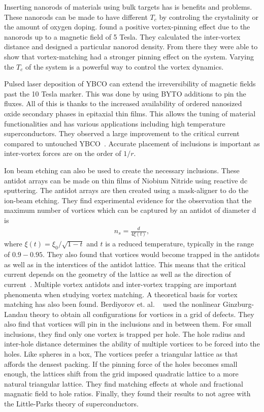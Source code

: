 Inserting nanorods of materials using bulk targets has is benefits and problems. These nanorods can be made to have different $T_c$ by controling the crystalinity or the amount of oxygen doping. \cite{Horii15} found a positive vortex-pinning effect due to the nanorods up to a magnetic field of 5 Tesla. They calculated the inter-vortex distance and designed a particular nanorod density. From there they were able to show that vortex-matching had a stronger pinning effect on the system. Varying the $T_c$ of the system is a powerful way to control the vortex dynamics.

Pulsed laser deposition of YBCO can extend the irreversibility of magnetic fields past the 10 Tesla marker. This was done by using BYTO additions to pin the fluxes. All of this is thanks to the increased availability of ordered nanosized oxide secondary phases in epitaxial thin films. This allows the tuning of material functionalities and has various applications including high temperature superconductors. They observed a large improvement to the critical current compared to untouched YBCO~\cite{Rizzo16}. Accurate placement of inclusions is important as inter-vortex forces are on the order of $1/r$.      

Ion beam etching can also be used to create the necessary inclusions. These antidot arrays can be made on thin films of Niobium Nitride using reactive dc sputtering. The antidot arrays are then created using a mask-aligner to do the ion-beam etching. They find experimental evidence for the observation that the maximum number of vortices which can be captured by an antidot of diameter d is
\begin{eqnarray}
n_s = \frac {d} {4 \xi(t)}, 
\label{}
\end{eqnarray}
where $\xi(t) = \xi_0 / \sqrt{1-t}$ and $t$ is a reduced temperature, typically in the range of $0.9 - 0.95$. They also found that vortices would become trapped in the antidots as well as in the interstices of the antidot lattice. This means that the critical current depends on the geometry of the lattice as well as the direction of current~\cite{Thakur09}. Multiple vortex antidots and inter-vortex trapping are important phenomenta when studying vortex matching. A theoretical basis for vortex matching has also been found. Berdiyorov et. al. ~\cite{Berdiyorov06} used the nonlinear Ginzburg-Landau theory to obtain all configurations for vortices in a grid of defects. They also find that vortices will pin in the inclusions and in between them. For small inclusions, they find only one vortex is trapped per hole. The hole radius and inter-hole distance determines the ability of multiple vortices to be forced into the holes. Like spheres in a box, The vortices prefer a triangular lattice as that affords the densest packing. If the pinning force of the holes becomes small enough, the lattices shift from the grid imposed quadratic lattice to a more natural triangular lattice. They find matching effects at whole and fractional magnatic field to hole ratios. Finally, they found their results to not agree with the Little-Parks theory of superconductors.

